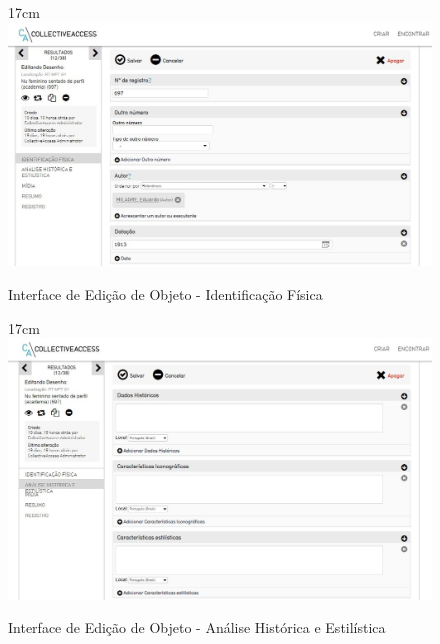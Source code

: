 \documentclass[a4paper,12pt,oneside,onecolumn,final,fleqn]{repUERJ}
\begin{document}
\begin{figure}[!ht]{17cm}
	\includegraphics[width=15cm, center]{figuras/tela_id_fis.jpg}
	\caption{Interface de Edição de Objeto - Identificação Física} \label{fig:tela_id_fis}
\end{figure}

\begin{figure}[!ht]{17cm}
	\includegraphics[width=15cm, center]{figuras/Tela_hist.jpg}
	\caption{Interface de Edição de Objeto - Análise Histórica e Estilística} \label{fig:Tela_hist}
\end{figure}
\end{document}
